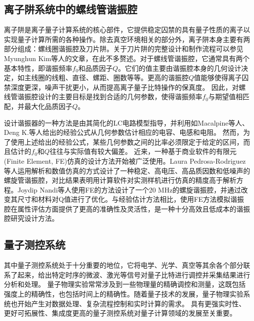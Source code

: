 \subsection[离子阱系统中的螺线管谐振腔]{离子阱系统中的螺线管谐振腔}

离子阱是离子量子计算系统的核心部件，它提供稳定囚禁的具有量子性质的离子以实现量子计算所需的各种操作。除去真空环境相关的部分外，离子阱本身主要有两部分组成：螺线圈谐振腔及刀片阱。关于刀片阱的完整设计和制作流程可以参见Myunghun Kim等人\cite[]{Kim_Kim_Hong_Lee_Moon_Lee_Kim_Ha_Sim_Lee_2022}的文章，在此不多赘述。对于螺线管谐振腔，它通常具有两个基本特性，即谐振频率$f_0$和品质因子$Q$。它们的值主要由谐振腔本身的几何设计决定，如主线圈的线粗、直径、螺距、圈数等等。更高的谐振腔$Q$值能够使得离子囚禁深度更深，噪声干扰更小，从而提高离子量子比特操作的保真度。
因此，对螺线管谐振腔设计的主要目标是找到合适的几何参数，使得谐振频率$f_0$与期望值相匹配，并最大化品质因子$Q$。

设计谐振器的一种方法是由其简化的LC电路模型指导，并利用如Macalpine等人\cite[]{Macalpine_Schildknecht_1959}、Deng K.等人\cite[]{Deng_Sun_Yuan_Xu_Zhang_Lu_Luo_2014}给出的经验公式从几何参数估计相应的电容、电感和电阻。
然而，为了使用上述给出的经验公式，某些几何参数之间的比率必须限定于给定的区间，而且估计的$f_0$和$Q$往往与实际值有较大偏差。
近来，一种基于商业软件的有限元(Finite Element, FE)仿真的设计方法开始被广泛使用。Laura Pedrosa-Rodriguez等人\cite[]{Pedrosa_Rodriguez_Outerelo_Gomez_Alcala_de_Vicente_Diaz_Otero_2018}运用解析和数值仿真的方式设计了一种稳定、高电压、高品质因数和低噪声的螺旋管谐振腔，对比结果表明用计算软件对实测样机进行仿真的精度高于解析方程。Joydip Nandi等人\cite[]{Nandi_Sikdar_Reza_Misra_Das_Ray_2020}使用FE的方法设计了一个20 MHz的螺旋谐振腔，并通过改变其尺寸和材料对Q值进行了优化。与经验估计方法相比，使用FE方法模拟谐振腔在属性评估方面提供了更高的准确性及灵活性，是一种十分高效且低成本的谐振腔研究设计方法。

\subsection[量子测控系统]{量子测控系统}
其中量子测控系统处于十分重要的地位，它将电学、光学、真空等其余各个部分联系了起来，给出特定时序的微波、激光等信号对量子比特进行调控并采集结果进行分析和处理。
量子物理实验常常涉及到一些物理量的精确调控和测量，这既包括强度上的精确性，也包括时间上的精确性。随着量子技术的发展，量子物理实验系统也开始产生对数据处理、复杂流程控制和实时计算的需求。
具有更强实时性、更好可拓展性、集成度更高的量子测控系统对量子计算领域的发展至关重要。

